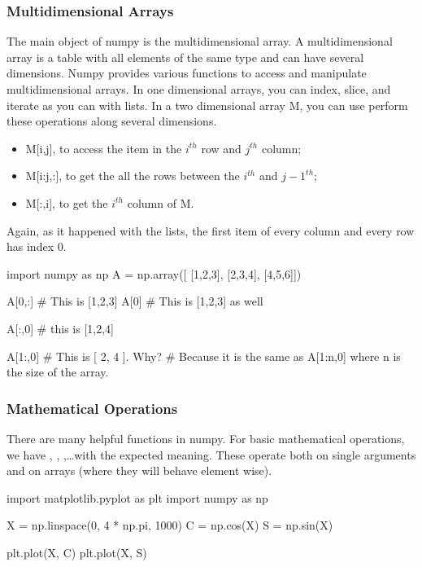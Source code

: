 \subsubsection{Multidimensional Arrays}

The main object of numpy is the multidimensional array. A multidimensional array is a table with all elements of the same type and can have several dimensions. Numpy provides various functions to access and manipulate multidimensional arrays. In one dimensional arrays, you can index, slice, and iterate as you can with lists. In a two dimensional array M, you can use perform these operations along several dimensions.

\begin{itemize}
 \item M[i,j], to access the item in the $i^{th}$ row and $j^{th}$ column; 
 \item M[i:j,:], to get the all the rows between the $i^{th}$ and $j-1^{th}$;
 \item M[:,i], to get the $i^{th}$ column of M.
\end{itemize}

Again, as it happened with the lists, the first item of every column and every row has index 0.

\begin{python}
import numpy as np
A = np.array([
    [1,2,3],
    [2,3,4],
    [4,5,6]])

A[0,:] # This is [1,2,3]
A[0] # This is [1,2,3] as well

A[:,0] # this is [1,2,4]

A[1:,0] # This is [ 2, 4 ]. Why?
        # Because it is the same as A[1:n,0] where n is the size of the array.
\end{python}

\subsubsection{Mathematical Operations}

There are many helpful functions in numpy. For basic mathematical operations, we have , , ,\ldots with the expected meaning. These operate both on single arguments and on arrays (where they will behave element wise).

\begin{python}
import matplotlib.pyplot as plt
import numpy as np

X = np.linspace(0, 4 * np.pi, 1000)
C = np.cos(X)
S = np.sin(X)

plt.plot(X, C)
plt.plot(X, S)
\end{python}

